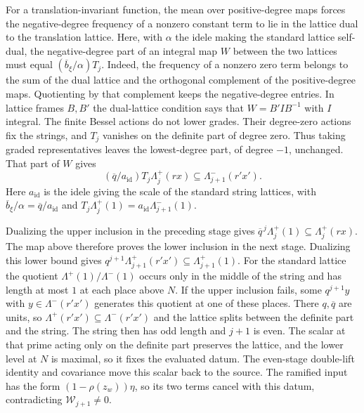 For a translation-invariant function, the mean over positive-degree
maps forces the negative-degree frequency of a nonzero constant term
to lie in the lattice dual to the translation lattice.
Here, with \(\alpha\) the idele making the standard lattice self-dual,
the negative-degree part of an integral map \(W\) between the two
lattices must equal \((\overline b_\xi/\alpha)T_j\).
Indeed, the frequency of a nonzero zero term belongs to the sum of
the dual lattice and the orthogonal complement of the positive-degree
maps. Quotienting by that complement keeps the negative-degree
entries. In lattice frames \(B,B'\) the dual-lattice condition says
that \(W=B' I B^{-1}\) with \(I\) integral.
The finite Bessel actions do not lower grades. Their degree-zero
actions fix the strings, and \(T_j\) vanishes on the definite part
of degree zero. Thus taking graded representatives leaves the
lowest-degree part, of degree \(-1\), unchanged.
That part of \(W\) gives
\[
   (\overline q/a_\mathrm{id})T_j\Lambda_j^+(r x)
          \subseteq\Lambda_{j+1}^-(r' x').
\]
Here \(a_\mathrm{id}\) is the idele giving the scale of the standard
string lattices, with
\(\overline b_\xi/\alpha=\overline q/a_\mathrm{id}\) and
\(T_j\Lambda_j^+(1)=a_\mathrm{id}\Lambda_{j+1}^-(1)\).

Dualizing the upper inclusion in the preceding stage gives
\(\overline q^{\,j}\Lambda_j^+(1)\subseteq\Lambda_j^+(r x)\).
The map above therefore proves the lower inclusion in the next stage.
Dualizing this lower bound gives \(q^{j+1}\Lambda_{j+1}^+(r'x')
\subseteq\Lambda_{j+1}^+(1)\).
For the standard lattice the quotient \(\Lambda^+(1)/\Lambda^-(1)\)
occurs only in the middle of the string and has length at most \(1\)
at each place above \(N\).
If the upper inclusion fails, some \(q^{j+1}y\) with
\(y\in\Lambda^-(r'x')\) generates this quotient at one of these places.
There \(q,\overline q\) are units, so
\(\Lambda^+(r'x')\subseteq\Lambda^-(r'x')\) and the lattice splits
between the definite part and the string.
The string then has odd length and \(j+1\) is even.
The scalar at that prime acting only on the definite part preserves
the lattice, and the lower level at \(N\) is maximal, so it fixes
the evaluated datum. The even-stage double-lift identity and
covariance move this scalar back to the source.
The ramified input has the form \((1-\rho(z_w))\eta\), so its two
terms cancel with this datum, contradicting \(\mathcal W_{j+1}\ne0\).

